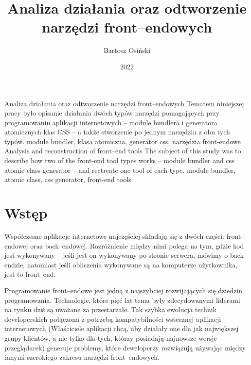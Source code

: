 \documentclass{SGGW-thesis}
\title{Analiza działania oraz odtworzenie narzędzi front--endowych}
\author{Bartosz Osiński}
\date{2022}
\begin{document}
\maketitle
\statementpage
\abstractpage %
{Analiza działania oraz odtworzenie narzędzi front–endowych}
{Tematem niniejszej pracy było opisanie działania dwóch typów narzędzi pomagających przy programowaniu aplikacji internetowych -- module bundlera i generatora atomicznych klas CSS -- a także stworzenie po jednym narzędziu z obu tych typów.}
{module bundler, klasa atomiczna, generator css, narzędzia front-endowe}
{Analysis and reconstruction of front--end tools}
{The subject of this study was to describe how two of the front-end tool types works -- module bundler and css atomic class generator -- and rectreate one tool of each type.}
{module bundler, atomic class, css generator, front-end tools}


{
  \doublespacing
  \tableofcontents
}

\startchapterfromoddpage %


\chapter{Wstęp}
Współczesne aplikacje internetowe najczęściej składają się z dwóch części: front--endowej oraz back--endowej. Rozróżnienie między nimi polega na tym, gdzie kod jest wykonywany -- jeśli jest on wykonywany po stronie serwera, mówimy o back--endzie, natomiast jeśli obliczenia wykonywane są na komputerze użytkownika, jest to front--end.

Programowanie front--endowe jest jedną z najszybciej rozwijających się dziedzin programowania. Technologie, które pięć lat temu były zdecydowanymi liderami na rynku dziś są uważane za przestarzałe. Tak szybka ewolucja technik developerskich połączona z potrzebą kompatybilności wstecznej aplikacji internetowych (Właściciele aplikacji chcą, aby działały one dla jak największej grupy klientów, a nie tylko dla tych, którzy posiadają najnowsze wersje przeglądarek) generuje problemy, które deweloperzy rozwiązują używając między innymi szerokiego zakresu narzędzi front--endowych.
\end{document}
